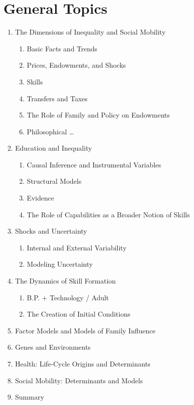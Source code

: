 \documentclass[12pt]{article}
\begin{document}
\section{General Topics}
\begin{enumerate}
\item The Dimensions of Inequality and Social Mobility
\begin{enumerate}
\item Basic Facts and Trends
\item Prices, Endowments, and Shocks
\item Skills
\item Transfers and Taxes
\item The Role of Family and Policy on Endowments
\item Philosophical \ldots
\end{enumerate}
\item Education and Inequality
\begin{enumerate}
\item Causal Inference and Instrumental Variables
\item Structural Models
\item Evidence
\item The Role of Capabilities as a Broader Notion of Skills
\end{enumerate}
\item Shocks and Uncertainty
\begin{enumerate}
\item Internal and External Variability
\item Modeling Uncertainty
\end{enumerate}
\item The Dynamics of Skill Formation
\begin{enumerate}
\item B.P. + Technology / Adult
\item The Creation of Initial Conditions 
\end{enumerate}
\item Factor Models and Models of Family Influence
\item Genes and Environments
\item Health: Life-Cycle Origins and Determinants
\item Social Mobility: Determinants and Models
\item Summary
\end{enumerate}
\end{document}
